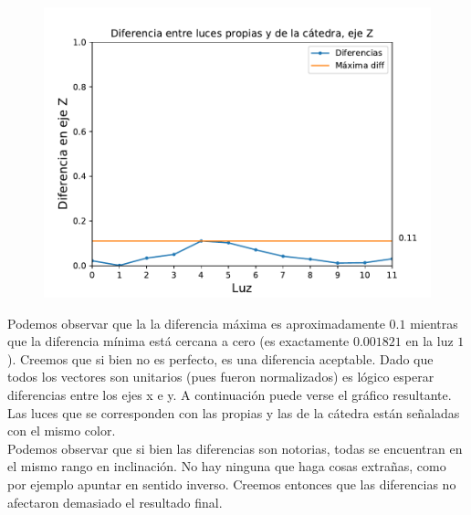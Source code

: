 {\centering
\begin{figure}[H]
\centering
    \includegraphics[scale=0.7]{informe/imagenes/lucesEjezDiferencias.pdf}
    \end{figure}
}

Podemos observar que la la diferencia máxima es aproximadamente $0.1$ mientras que la diferencia mínima está cercana a cero (es exactamente $0.001821$ en la luz $1$). Creemos que si bien no es perfecto, es una diferencia aceptable. Dado que todos los vectores son unitarios (pues fueron normalizados) es lógico esperar diferencias entre los ejes x e y. A continuación puede verse el gráfico resultante. Las luces que se corresponden con las propias y las de la cátedra están señaladas con el mismo color. \\

Podemos observar que si bien las diferencias son notorias, todas se encuentran en el mismo rango en inclinación. No hay ninguna que haga cosas extrañas, como por ejemplo apuntar en sentido inverso. Creemos entonces que las diferencias no afectaron demasiado el resultado final.

